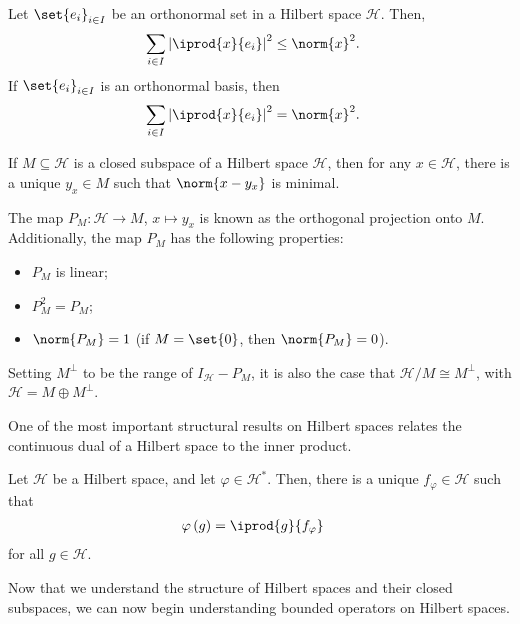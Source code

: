 \begin{theorem}
  Let $\set{e_i}_{i\in I}$ be an orthonormal set in a Hilbert space $\mathcal{H}$. Then,
  \begin{align*}
    \sum_{i\in I} \left\vert \iprod{x}{e_i} \right\vert^2 &\leq \norm{x}^2.
  \end{align*}
  If $\set{e_i}_{i\in I}$ is an orthonormal basis, then
  \begin{align*}
    \sum_{i\in I} \left\vert \iprod{x}{e_i} \right\vert^2 &= \norm{x}^2.
  \end{align*}
\end{theorem}
\begin{theorem}\label{thm:projection_theorem}
  If $M\subseteq \mathcal{H}$ is a closed subspace of a Hilbert space $\mathcal{H}$, then for any $x\in \mathcal{H}$, there is a unique $y_x\in M$ such that $\norm{x-y_x}$ is minimal.\newline

  The map $P_M\colon \mathcal{H}\rightarrow M$, $x\mapsto y_x$ is known as the orthogonal projection onto $M$. Additionally, the map $P_M$ has the following properties:
  \begin{itemize}
    \item $P_M$ is linear;
    \item $P_M^2 = P_M$;
    \item $\norm{P_M} = 1$ (if $M = \set{0}$, then $\norm{P_M} = 0$).
  \end{itemize}
  Setting $M^{\perp}$ to be the range of $I_{\mathcal{H}} - P_M$, it is also the case that $\mathcal{H}/M \cong M^{\perp}$, with $\mathcal{H} = M\oplus M^{\perp}$.
\end{theorem}
One of the most important structural results on Hilbert spaces relates the continuous dual of a Hilbert space to the inner product. 
\begin{theorem}
  Let $\mathcal{H}$ be a Hilbert space, and let $\varphi\in \mathcal{H}^{\ast}$. Then, there is a unique $f_{\varphi}\in \mathcal{H}$ such that
  \begin{align*}
    \varphi\left(g\right) &= \iprod{g}{f_{\varphi}}
  \end{align*}
  for all $g\in \mathcal{H}$.
\end{theorem}
Now that we understand the structure of Hilbert spaces and their closed subspaces, we can now begin understanding bounded operators on Hilbert spaces.
